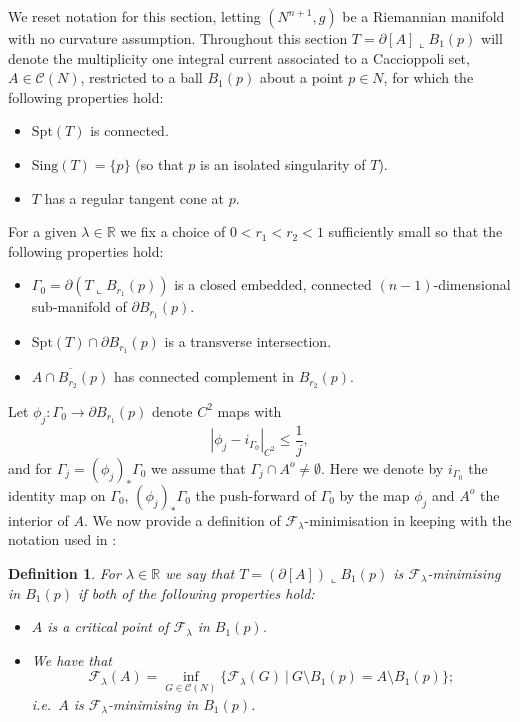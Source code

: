 \documentclass[11pt]{article}
\newtheorem{definition}{Definition}
\begin{document}
We reset notation for this section, letting $(N^{n+1},g)$ be a Riemannian manifold with no curvature assumption. Throughout this section $T = \partial [A]\llcorner B_1(p)$ will denote the multiplicity one integral current associated to a Caccioppoli set, $A \in \mathcal{C}(N)$, restricted to a ball $B_1(p)$ about a point $p \in N$, for which the following properties hold:
\begin{itemize}
    \item $\mathrm{Spt}(T)$ is connected.
    
    \item $\mathrm{Sing}(T) = \{p\}$ (so that $p$ is an isolated singularity of $T$).
    
    \item $T$ has a regular tangent cone at $p$.
\end{itemize}
For a given $\lambda \in \mathbb{R}$ we fix a choice of $0 < r_1 < r_2 < 1$ sufficiently small so that the following properties hold:
\begin{itemize}
    \item $\Gamma_0 = \partial(T \llcorner B_{r_1}(p))$ is a closed embedded, connected $(n-1)$-dimensional sub-manifold of $\partial B_{r_1}(p)$.

    \item $\mathrm{Spt}(T) \cap \partial B_{r_1}(p)$ is a transverse intersection.

    \item $\overline{A \cap B_{r_2}(p)}$ has connected complement in $B_{r_2}(p)$.
\end{itemize}
Let $\phi_j : \Gamma_0 \rightarrow \partial B_{r_1}(p)$ denote $C^2$ maps with
\begin{equation*}
    |\phi_j - i_{\Gamma_0}|_{C^2} \leq \frac{1}{j},
\end{equation*}
and for $\Gamma_j = (\phi_j)_* \Gamma_0$ we assume that $\Gamma_j \cap A^o \neq \emptyset$. Here we denote by $i_{\Gamma_0}$ the identity map on $\Gamma_0$, $(\phi_j)_* \Gamma_0$ the push-forward of $\Gamma_0$ by the map $\phi_j$ and $A^o$ the interior of $A$. We now provide a definition of $\mathcal{F}_\lambda$-minimisation in keeping with the notation used in \cite{Kostas23}:

\begin{definition}\label{def: one-sided minimiser}
For $\lambda \in \mathbb{R}$ we say that $T = (\partial [A])\llcorner B_1(p)$ is $\mathcal{F}_\lambda$-minimising in $B_1(p)$ if both of the following properties hold:
\begin{itemize}
    \item $A$ is a critical point of $\mathcal{F}_\lambda$ in $B_1(p)$.

    \item We have that 
    \begin{equation*}
        \mathcal{F}_\lambda(A) = \inf_{G \in \mathcal{C}(N)} \{ \mathcal{F}_\lambda(G) \: | \: G \setminus B_1(p) = A \setminus B_1(p) \};
    \end{equation*}
    i.e.~$A$ is $\mathcal{F}_\lambda$-minimising in $B_1(p)$.
\end{itemize}
\end{definition}
\end{document}
